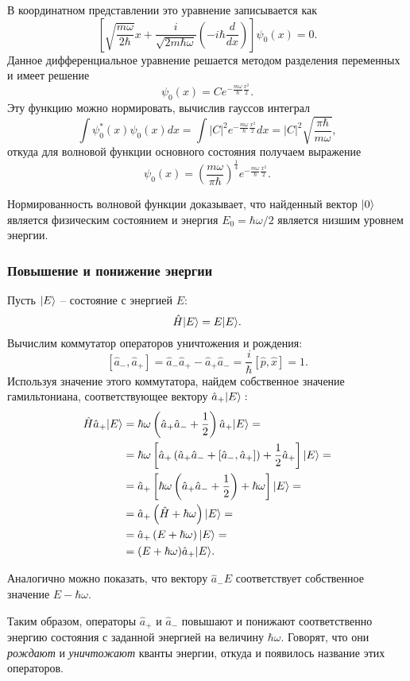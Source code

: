 \documentclass[b5paper]{book}
\DeclarePairedDelimiter\ket{\lvert}{\rangle}
\begin{document}
В координатном представлении это уравнение записывается как
$$\left[\sqrt{\frac{m\omega}{2\hbar}} x + \frac{i}{\sqrt{2m \hbar \omega}}
\left(-i \hbar \frac {d}{dx} \right)
\right] \psi_0(x) = 0.$$
Данное дифференциальное уравнение решается методом разделения переменных и имеет решение
$$\psi_0(x) = C e^{-\frac{m\omega}{\hbar}\frac{x^2}{2}}.$$
Эту функцию можно нормировать, вычислив гауссов интеграл
$$\int \psi_0^*(x) \psi_0(x) dx = \int |C|^2 e^{-\frac{m\omega}{\hbar}\frac{x^2}{2}} dx=
|C|^2 \sqrt{\frac{\pi \hbar}{m \omega}},$$
откуда для волновой функции основного состояния получаем выражение
\begin{equation}\label{osc-ground-state}
 \psi_0(x) = \left(\frac{m\omega}{\pi \hbar}\right)^{\frac 1 4} e^{-\frac{m\omega}{\hbar} \frac{x^2}{2}}.
\end{equation}

Нормированность волновой функции доказывает, что найденный вектор $\ket{0}$ является физическим
состоянием и энергия $E_0 = \hbar \omega / 2$ является низшим уровнем энергии.

\subsubsection*{Повышение и понижение энергии}

Пусть $\ket{E}$ -- состояние с энергией $E:$
$$\hat H \ket{E} = E \ket{E}.$$
Вычислим коммутатор операторов уничтожения и рождения:
$$[\hat a_{-}, \hat a_{+}] = \hat a_{-} \hat a_{+} - \hat a_{+} \hat a_{-} = \frac {i} {\hbar} [\hat p, \hat x] = 1.$$
Используя значение этого коммутатора, найдем собственное значение гамильтониана, соответствующее вектору
$\hat a_{+} \ket {E}:$
\begin{equation}
\begin{aligned}
 \hat H \hat a_{+} \ket{E} &=
 \hbar\omega\left(\hat a_{+} \hat a_{-} + \frac 1 2\right) \hat a_{+} \ket{E} =\\
 &= \hbar\omega \left[\hat a_{+} \left(\hat a_{+} \hat a_{-} + [\hat a_{-}, \hat a_{+}]\right)
    + \frac 1 2 \hat a_{+}\right] \ket{E} =\\
 &= \hat a_{+} \left[\hbar\omega \left(\hat a_{+} \hat a_{-} + \frac 1 2\right) + \hbar \omega\right] \ket{E} =\\
 &= \hat a_{+} \left(\hat H + \hbar \omega\right) \ket{E} =\\
 &= \hat a_{+} \left(E + \hbar \omega\right) \ket{E} =\\
 &= (E + \hbar\omega) \hat a_{+} \ket{E}.
\end{aligned}
\end{equation}

Аналогично можно показать, что вектору $\hat a_{-} E$ соответствует собственное значение $E - \hbar \omega.$

Таким образом, операторы $\hat a_{+}$ и $\hat a_{-}$ повышают и понижают соответственно
энергию состояния с заданной энергией на величину $\hbar \omega.$ Говорят, что они \textit{рождают}
и \textit{уничтожают} кванты энергии, откуда и появилось название этих операторов.
\end{document}
